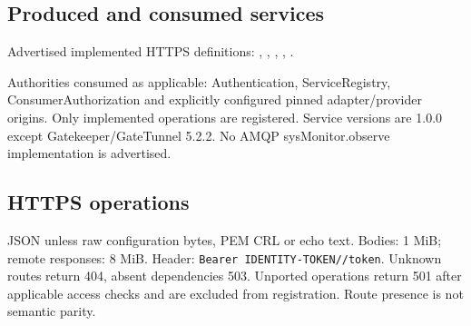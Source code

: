 \documentclass[a4paper]{arrowhead}
\begin{document}
\subsection{Produced and consumed services}
Advertised implemented HTTPS definitions: , \allowbreak {}, \allowbreak {}, \allowbreak {}, \allowbreak {}.\par
Authorities consumed as applicable: Authentication, ServiceRegistry, ConsumerAuthorization and explicitly configured pinned adapter/provider origins. Only implemented operations are registered. Service versions are 1.0.0 except Gatekeeper/GateTunnel 5.2.2. No AMQP sysMonitor.observe implementation is advertised.
\clearpage
\subsection{HTTPS operations}
JSON unless raw configuration bytes, PEM CRL or echo text. Bodies: 1 MiB; remote responses: 8 MiB. Header: \texttt{Bearer IDENTITY-TOKEN//token}. Unknown routes return 404, absent dependencies 503. Unported operations return 501 after applicable access checks and are excluded from registration. Route presence is not semantic parity.
\end{document}
